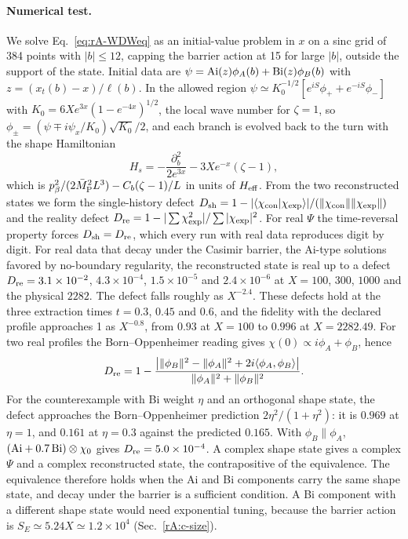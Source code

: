 \paragraph{Numerical test.}
We solve Eq.~\eqref{eq:rA-WDWeq} as an initial-value problem in $x$ on a sinc grid of 384 points with $|b|\leq12$, capping the barrier action at 15 for large $|b|$, outside the support of the state. %
Initial data are $\psi={\rm Ai}(z)\phi_A(b)+{\rm Bi}(z)\phi_B(b)$ with $z=(x_t(b)-x)/\ell(b)$.
In the allowed region $\psi\simeq K_0^{-1/2}[e^{iS}\phi_++e^{-iS}\phi_-]$ with $K_0=6Xe^{3x}(1-e^{-4x})^{1/2}$, the local wave number for $\zeta=1$, so $\phi_\pm=(\psi\mp i\psi_x/K_0)\sqrt{K_0}/2$, and each branch is evolved back to the turn with the shape Hamiltonian
\begin{equation}
H_s=-\frac{\partial_b^2}{2e^{3x}}-3Xe^{-x}(\zeta-1),
\end{equation}
which is $p_\beta^2/(2\bar M_{\mathrm{P}}^2L^3)-C_b(\zeta-1)/L$ in units of $H_{\mathrm{eff}}$.
From the two reconstructed states we form the single-history defect $D_{\rm sh}=1-|\langle\chi_{\rm con}|\chi_{\rm exp}\rangle|/(\|\chi_{\rm con}\|\|\chi_{\rm exp}\|)$ and the reality defect $D_{\rm re}=1-|\sum\chi_{\rm exp}^2|/\sum|\chi_{\rm exp}|^2$.
For real $\Psi$ the time-reversal property forces $D_{\rm sh}=D_{\rm re}$, which every run with real data reproduces digit by digit.
For real data that decay under the Casimir barrier, the Ai-type solutions favored by no-boundary regularity, the reconstructed state is real up to a defect $D_{\rm re}=3.1\times10^{-2}$, $4.3\times10^{-4}$, $1.5\times10^{-5}$ and $2.4\times10^{-6}$ at $X=100$, $300$, $1000$ and the physical $2282$. %
The defect falls roughly as $X^{-2.4}$. %
These defects hold at the three extraction times $t=0.3$, $0.45$ and $0.6$, and the fidelity with the declared profile approaches 1 as $X^{-0.8}$, from $0.93$ at $X=100$ to $0.996$ at $X=2282.49$. %
For two real profiles the Born--Oppenheimer reading gives $\chi(0)\propto i\phi_A+\phi_B$, hence
\begin{equation}
D_{\rm re}=1-\frac{\big|\|\phi_B\|^2-\|\phi_A\|^2+2i\langle\phi_A,\phi_B\rangle\big|}{\|\phi_A\|^2+\|\phi_B\|^2}.
\end{equation}
For the counterexample with Bi weight $\eta$ and an orthogonal shape state, the defect approaches the Born--Oppenheimer prediction $2\eta^2/(1+\eta^2)$: it is $0.969$ at $\eta=1$, and $0.161$ at $\eta=0.3$ against the predicted $0.165$. %
With $\phi_B\parallel\phi_A$, $({\rm Ai}+0.7\,{\rm Bi})\otimes\chi_0$ gives $D_{\rm re}=5.0\times10^{-4}$. %
A complex shape state gives a complex $\Psi$ and a complex reconstructed state, the contrapositive of the equivalence.
The equivalence therefore holds when the Ai and Bi components carry the same shape state, and decay under the barrier is a sufficient condition.
A Bi component with a different shape state would need exponential tuning, because the barrier action is $S_E\simeq5.24X\simeq1.2\times10^4$ (Sec.~\ref{rA:c-size}). %

